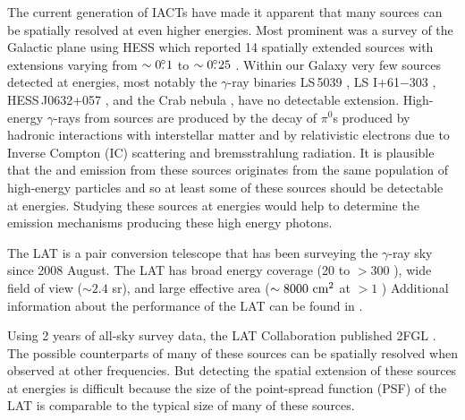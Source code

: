 The current generation of \acp{IACT} have made it apparent
that many sources can be spatially resolved at even higher energies.
Most prominent was a survey of the Galactic plane using \ac{HESS}
which reported 14 spatially extended
sources with extensions varying from $\sim0\mbox{$.\!\!^\circ$}1$ to $\sim0\mbox{$.\!\!^\circ$}25$
\citep{aharonian_2006a_h.e.s.s.-survey}.  Within our Galaxy very few
sources detected at \tev energies, most notably the $\gamma$-ray
binaries LS\,5039 \citep{aharonian_2006a_orbital-modulation},
LS I+61$-$303 \citep{albert_2006a_variable-very-high-energy,
acciari_2011a_veritas-observations}, HESS\,J0632+057
\citep{aharonian_2007a_discovery-point-like}, and the Crab nebula
\citep{weekes_1989a_observation-gamma}, have no detectable extension.
High-energy $\gamma$-rays from \tev sources are produced by the decay
of $\pi^0$s produced by hadronic interactions with interstellar matter
and by relativistic electrons due to Inverse Compton (IC) scattering and
bremsstrahlung radiation.  It is plausible that the \gev and \tev emission
from these sources originates from the same population of high-energy
particles and so at least some of these sources should be detectable at
\gev energies.  Studying these \tev sources at \gev energies would help
to determine the emission mechanisms producing these high energy photons.

The LAT is a pair conversion telescope that has been surveying
the $\gamma$-ray sky since 2008 August.  The LAT has broad energy
coverage (20 \mev to $>300$ \gev), wide field of view ($\sim 2.4$
sr), and large effective area ($\sim 8000\ \cm^2$ at $>1$ \gev)
Additional information about the performance of the LAT can be found
in \cite{atwood_2009a_large-telescope}.

Using 2 years of all-sky survey data, the LAT Collaboration published
2FGL \citep[2FGL,][]{nolan_2012_fermi-large}.  The possible counterparts
of many of these sources can be spatially resolved when observed at other
frequencies. But detecting the spatial extension of these sources at \gev
energies is difficult because the size of the point-spread function (PSF)
of the LAT is comparable to the typical size of many of these sources.

